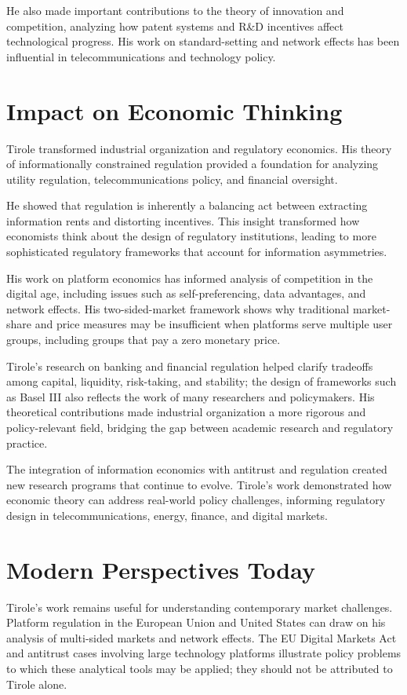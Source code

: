He also made important contributions to the theory of innovation and competition,
analyzing how patent systems and R\&D incentives affect technological progress.
His work on standard-setting and network effects has been influential in
telecommunications and technology policy.

\section{Impact on Economic Thinking}
Tirole transformed industrial organization and regulatory economics. His theory
of informationally constrained regulation provided a foundation for analyzing
utility regulation, telecommunications policy, and financial oversight.

He showed that regulation is inherently a balancing act between extracting
information rents and distorting incentives. This insight transformed how
economists think about the design of regulatory institutions, leading to more
sophisticated regulatory frameworks that account for information asymmetries.

His work on platform economics has informed analysis of competition in the digital
age, including issues such as self-preferencing, data advantages, and network
effects. His two-sided-market framework shows why traditional market-share and
price measures may be insufficient when platforms serve multiple user groups,
including groups that pay a zero monetary price.

Tirole's research on banking and financial regulation helped clarify tradeoffs
among capital, liquidity, risk-taking, and stability; the design of frameworks
such as Basel III also reflects the work of many researchers and policymakers.
His theoretical contributions made industrial organization a more rigorous and
policy-relevant field, bridging the gap between academic research and regulatory
practice.

The integration of information economics with antitrust and regulation created
new research programs that continue to evolve. Tirole's work demonstrated how
economic theory can address real-world policy challenges, informing regulatory
design in telecommunications, energy, finance, and digital markets.

\section{Modern Perspectives Today}
Tirole's work remains useful for understanding contemporary market challenges.
Platform regulation in the European Union and United States can draw on his
analysis of multi-sided markets and network effects. The EU Digital Markets Act
and antitrust cases involving large technology platforms illustrate policy
problems to which these analytical tools may be applied; they should not be
attributed to Tirole alone.


